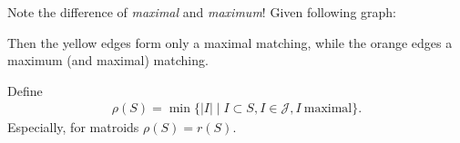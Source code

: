 \begin{example}
    Note the difference of \emph{maximal} and \emph{maximum}! Given following graph:
    \\
    \begin{minipage}{\textwidth}
        \centering
    \end{minipage}
    Then the yellow edges form only a maximal matching, while the orange edges a maximum (and maximal) matching.
\end{example}
Define
\begin{align*}
    \rho(S) = \min \{|I|\mid I \subset S, I \in \mathcal{J}, I\ \text{maximal}\}.
\end{align*}
Especially, for matroids $\rho(S)=r(S)$.

